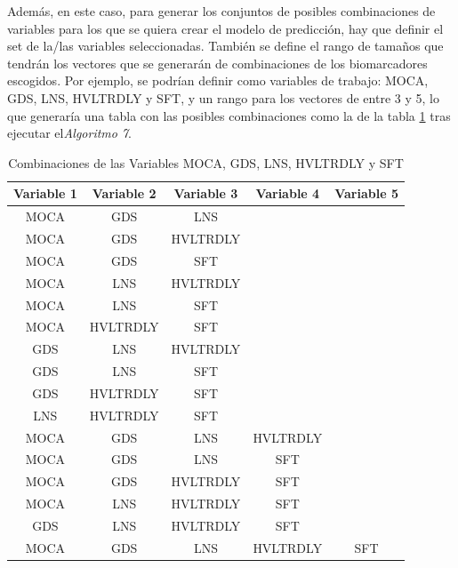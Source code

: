Además, en este caso, para generar los conjuntos de posibles combinaciones de variables para los que se quiera crear el modelo de predicción, hay que definir el set de la/las variables seleccionadas. También se define el rango de tamaños que tendrán los vectores que se generarán de combinaciones de los biomarcadores escogidos. Por ejemplo, se podrían definir como variables de trabajo: MOCA, GDS, LNS, HVLTRDLY y SFT, y un rango para los vectores de entre 3 y 5, lo que generaría una tabla con las posibles combinaciones como la de la tabla \ref{tab:combinaciones} tras ejecutar el\textit{Algoritmo 7}.\\

	
\begin{table}[h!]
	\centering
	\label{tab:combinaciones}
	\begin{tabular}{|c|c|c|c|c|}
		\hline
		\textbf{Variable 1} & \textbf{Variable 2} & \textbf{Variable 3} & \textbf{Variable 4} & \textbf{Variable 5} \\ \hline
		MOCA & GDS & LNS &  &  \\ \hline
		MOCA & GDS & HVLTRDLY &  &  \\ \hline
		MOCA & GDS & SFT &  &  \\ \hline
		MOCA & LNS & HVLTRDLY &  &  \\ \hline
		MOCA & LNS & SFT &  &  \\ \hline
		MOCA & HVLTRDLY & SFT &  &  \\ \hline
		GDS & LNS & HVLTRDLY &  &  \\ \hline
		GDS & LNS & SFT &  &  \\ \hline
		GDS & HVLTRDLY & SFT &  &  \\ \hline
		LNS & HVLTRDLY & SFT &  &  \\ \hline
		MOCA & GDS & LNS & HVLTRDLY &  \\ \hline
		MOCA & GDS & LNS & SFT &  \\ \hline
		MOCA & GDS & HVLTRDLY & SFT &  \\ \hline
		MOCA & LNS & HVLTRDLY & SFT &  \\ \hline
		GDS & LNS & HVLTRDLY & SFT &  \\ \hline
		MOCA & GDS & LNS & HVLTRDLY & SFT \\ \hline
	\end{tabular}
	\caption{Combinaciones de las Variables MOCA, GDS, LNS, HVLTRDLY y SFT}
\end{table}
	
